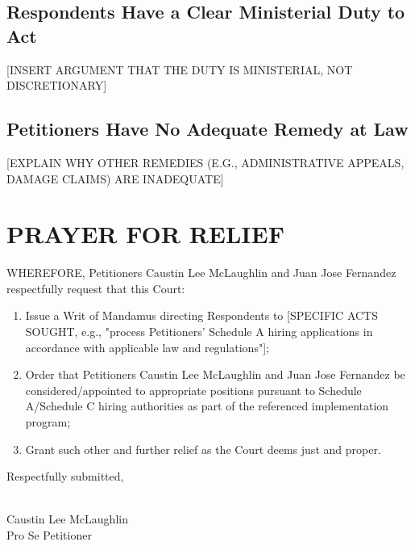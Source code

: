 \documentclass[12pt]{article}
\begin{document}
\subsection{Respondents Have a Clear Ministerial Duty to Act}

[INSERT ARGUMENT THAT THE DUTY IS MINISTERIAL, NOT DISCRETIONARY]

\subsection{Petitioners Have No Adequate Remedy at Law}

[EXPLAIN WHY OTHER REMEDIES (E.G., ADMINISTRATIVE APPEALS, DAMAGE CLAIMS) ARE INADEQUATE]

\section{PRAYER FOR RELIEF}

WHEREFORE, Petitioners Caustin Lee McLaughlin and Juan Jose Fernandez respectfully request that this Court:

\begin{enumerate}[label=\arabic*.]
    \item Issue a Writ of Mandamus directing Respondents to [SPECIFIC ACTS SOUGHT, e.g., "process Petitioners' Schedule A hiring applications in accordance with applicable law and regulations"];
    
    \item Order that Petitioners Caustin Lee McLaughlin and Juan Jose Fernandez be considered/appointed to appropriate positions pursuant to Schedule A/Schedule C hiring authorities as part of the referenced implementation program;
    
    \item Grant such other and further relief as the Court deems just and proper.
\end{enumerate}

\vspace{0.5in}

Respectfully submitted,

\vspace{0.5in}

\underline{\hspace{3in}} \\
Caustin Lee McLaughlin \\
Pro Se Petitioner

\vspace{0.3in}
\end{document}
